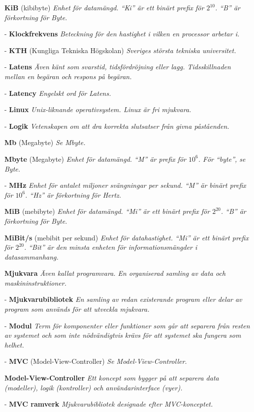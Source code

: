 \documentclass[a4paper, twoside, 11pt, titlepage]{article}
\begin{document}
\textbf{KiB} (kibibyte) \emph{Enhet för datamängd. ``Ki'' är ett binärt prefix för $2^{10}$. ``B'' är förkortning för Byte.}

- \textbf{Klockfrekvens} \emph{Beteckning för den hastighet i vilken en processor arbetar i.}

- \textbf{KTH} (Kungliga Tekniska Högskolan) \emph{Sveriges största tekniska universitet.}

- \textbf{Latens} \emph{Även känt som svarstid, tidsfördröjning eller lagg. Tidsskillnaden mellan en begäran och respons på begäran.}

- \textbf{Latency} \emph{Engelskt ord för Latens.}

- \textbf{Linux} \emph{Unix-liknande operativsystem. Linux är fri mjukvara.}

- \textbf{Logik} \emph{Vetenskapen om att dra korrekta slutsatser från givna påståenden.}

\textbf{Mb} (Megabyte) \emph{Se Mbyte.}

\textbf{Mbyte} (Megabyte) \emph{Enhet för datamängd. ``M'' är prefix för $10^{6}$. För ``byte'', se Byte.}

- \textbf{MHz} \emph{Enhet för antalet miljoner svängningar per sekund. ``M'' är binärt prefix för $10^{6}$. ``Hz'' är förkortning för Hertz.}

\textbf{MiB} (mebibyte) \emph{Enhet för datamängd. ``Mi'' är ett binärt prefix för $2^{20}$. ``B'' är förkortning för Byte.}

\textbf{MiBit/s} (mebibit per sekund) \emph{Enhet för datahastighet. ``Mi'' är ett binärt prefix för $2^{20}$. ``Bit'' är den minsta enheten för informationsmängder i datasammanhang.}

\textbf{Mjukvara} \emph{Även kallat programvara. En organiserad samling av data och maskininstruktioner.}

- \textbf{Mjukvarubibliotek} \emph{En samling av redan existerande program eller delar av program som används för att utveckla mjukvara.}

- \textbf{Modul} \emph{Term för komponenter eller funktioner som går att separera från resten av systemet och som inte nödvändigtvis krävs för att systemet ska fungera som helhet.}

- \textbf{MVC} (Model-View-Controller) \emph{Se Model-View-Controller.}

\textbf{Model-View-Controller} \emph{Ett koncept som bygger på att separera data (modeller), logik (kontroller) och användarinterface (vyer).}

- \textbf{MVC ramverk} \emph{Mjukvarubibliotek designade efter MVC-konceptet.}
\end{document}
